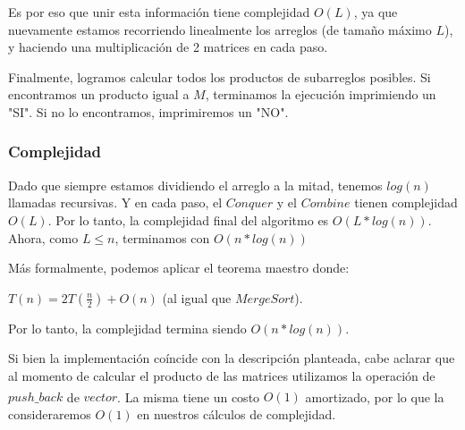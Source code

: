 Es por eso que unir esta información tiene complejidad $O(L)$, ya que nuevamente estamos recorriendo linealmente los arreglos (de tamaño máximo $L$), y haciendo una multiplicación de 2 matrices en cada paso.

Finalmente, logramos calcular todos los productos de subarreglos posibles. Si encontramos un producto igual a $M$, terminamos la ejecución imprimiendo un "SI". Si no lo encontramos, imprimiremos un "NO".
\subsubsection{Complejidad}
Dado que siempre estamos dividiendo el arreglo a la mitad, tenemos $log(n)$ llamadas recursivas. Y en cada paso, el $Conquer$ y el $Combine$ tienen complejidad $O(L)$. Por lo tanto, la complejidad final del algoritmo es $O(L * log(n))$. Ahora, como $L \leq n$, terminamos con $O(n * log(n))$

Más formalmente, podemos aplicar el teorema maestro donde:

$T(n)=2T\left({\frac {n}{2}}\right)+O(n)$	 (al igual que $Merge Sort$).

Por lo tanto, la complejidad termina siendo $O(n * log(n))$.

Si bien la implementación coíncide con la descripción planteada, cabe aclarar que al momento de calcular el producto de las matrices utilizamos la operación de $push\_back$ \textsuperscript{\cite{pushback}} de $vector$. La misma tiene un costo $O(1)$ amortizado, por lo que la consideraremos $O(1)$ en nuestros cálculos de complejidad.